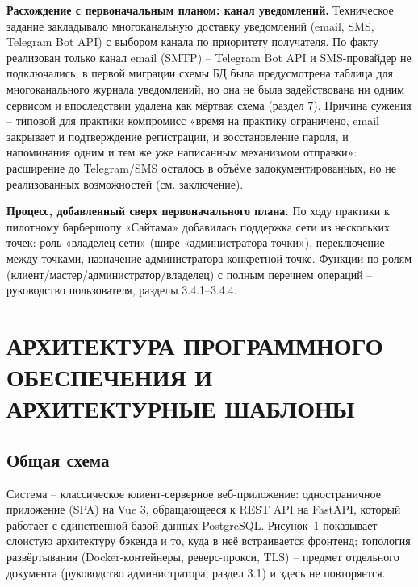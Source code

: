\textbf{Расхождение с первоначальным планом: канал уведомлений.}
Техническое задание закладывало многоканальную доставку уведомлений
(email, SMS, Telegram Bot API) с выбором канала по приоритету получателя.
По факту реализован только канал email (SMTP) -- Telegram Bot API и
SMS-провайдер не подключались; в первой миграции схемы БД была
предусмотрена таблица для многоканального журнала уведомлений, но она не
была задействована ни одним сервисом и впоследствии удалена как мёртвая
схема (раздел 7). Причина сужения -- типовой для практики компромисс
«время на практику ограничено, email закрывает и подтверждение регистрации,
и восстановление пароля, и напоминания одним и тем же уже написанным
механизмом отправки»: расширение до Telegram/SMS осталось в объёме
задокументированных, но не реализованных возможностей (см. заключение).

\textbf{Процесс, добавленный сверх первоначального плана.} По ходу
практики к пилотному барбершопу «Сайтама» добавилась поддержка сети из
нескольких точек: роль «владелец сети» (шире «администратора точки»),
переключение между точками, назначение администратора конкретной точке.
Функции по ролям (клиент/мастер/администратор/владелец) с полным перечнем
операций -- руководство пользователя, разделы 3.4.1--3.4.4.

\section{АРХИТЕКТУРА ПРОГРАММНОГО ОБЕСПЕЧЕНИЯ И АРХИТЕКТУРНЫЕ ШАБЛОНЫ}

\subsection{Общая схема}

Система -- классическое клиент-серверное веб-приложение: одностраничное
приложение (SPA) на Vue 3, обращающееся к REST API на FastAPI, который
работает с единственной базой данных PostgreSQL. Рисунок~1 показывает
слоистую архитектуру бэкенда и то, куда в неё встраивается фронтенд;
топология развёртывания (Docker-контейнеры, реверс-прокси, TLS) -- предмет
отдельного документа (руководство администратора, раздел 3.1) и здесь не
повторяется.


